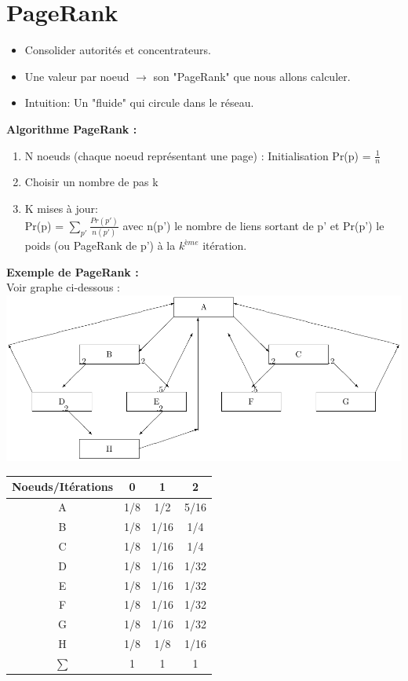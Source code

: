 \section{PageRank}
\begin{itemize}
\item Consolider autorités et concentrateurs.
\item Une valeur par noeud $ \rightarrow $ son "PageRank" que nous allons calculer. 
\item Intuition: Un "fluide" qui circule dans le réseau. 
\end{itemize}
\textbf{ Algorithme PageRank :}
\begin{enumerate}
\item N noeuds (chaque noeud représentant une page) : Initialisation Pr(p) =  $\frac{1}{n}$
\item Choisir un nombre de pas k
\item K mises à jour:\\
Pr(p) = $ \sum_ {p'}\frac{Pr(p')}{n(p')} $ avec n(p') le nombre de liens sortant de p' et Pr(p') le poids (ou PageRank de p') à la $k^{ème}$ itération.
\end{enumerate}
\textbf{Exemple de PageRank :}\\
Voir graphe ci-dessous : \\ 
 \includegraphics[scale=0.8]{images/24_imagePr.pdf}
 
 	\begin{tabular}{|c| c |c |c |}
		\hline
		Noeuds/Itérations & 0 & 1 & 2 \\
		\hline
		A & 1/8 & 1/2 & 5/16 \\
		B & 1/8 & 1/16 &  1/4   \\
		C & 1/8 & 1/16 & 1/4    \\
		D & 1/8 & 1/16 & 1/32  \\
		E & 1/8 & 1/16 &  1/32   \\
		F & 1/8 & 1/16 & 1/32    \\
		G & 1/8 & 1/16 & 1/32    \\
		H & 1/8 & 1/8 &  1/16   \\
		\hline
		$\sum $ & 1 & 1 & 1 \\
		\hline
	\end{tabular}

